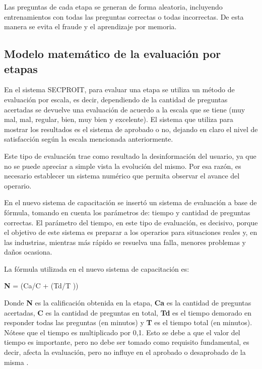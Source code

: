 Las preguntas de cada etapa se generan de forma aleatoria, incluyendo entrenamientos con todas las preguntas correctas o todas incorrectas. De esta manera se evita el fraude y el aprendizaje por memoria.

\subsection{Modelo matemático de la evaluación por etapas}
En el sistema SECPROIT, para evaluar una etapa se utiliza un método de evaluación por escala, es decir, dependiendo de la cantidad de preguntas acertadas se devuelve una evaluación de acuerdo a la escala que se tiene (muy mal, mal, regular, bien, muy bien y excelente). El sistema que utiliza para mostrar los resultados es el sistema de aprobado o no, dejando en claro el nivel de satisfacción según la escala mencionada anteriormente.

Este tipo de evaluación trae como resultado la desinformación del usuario, ya que no se puede apreciar a simple vista la evolución del mismo. Por esa razón, es necesario establecer un sistema numérico que permita observar el avance del operario.

En el nuevo sistema de capacitación se insertó un sistema de evaluación a base de fórmula, tomando en cuenta los parámetros de: tiempo y cantidad de preguntas correctas. El parámetro del tiempo, en este tipo de evaluación, es decisivo, porque el objetivo de este sistema es preparar a los operarios para situaciones reales y, en las industrias, mientras más rápido se resuelva una falla, menores problemas y daños ocasiona.

La fórmula utilizada en el nuevo sistema de capacitación es:

\vspace{0.2cm}
\begin{center}
\begin{Large}
\textbf{N} = (Ca/C + (Td/T ))
\end{Large}
\end{center}
\vspace{0.15cm}

Donde \textbf{N} es la calificación obtenida en la etapa, \textbf{Ca} es la cantidad de preguntas acertadas, \textbf{C} es la cantidad de preguntas en total, \textbf{Td} es el tiempo demorado en responder todas las preguntas (en minutos) y \textbf{T} es el tiempo total (en minutos). Nótese que el tiempo es multiplicado por 0,1. Esto se debe a que el valor del tiempo es importante, pero no debe ser tomado como requisito fundamental, es decir, afecta la evaluación, pero no influye en el aprobado o desaprobado de la misma \cite{Castrillon2021}.

